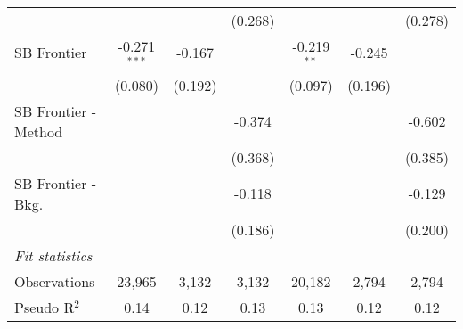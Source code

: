 \begin{tabular}{lcccccc}
                        &                &         & (0.268)       &               &              & (0.278)\\   
   SB Frontier          & -0.271$^{***}$ & -0.167  &               & -0.219$^{**}$ & -0.245       &   \\   
                        & (0.080)        & (0.192) &               & (0.097)       & (0.196)      &   \\   
   SB Frontier - Method &                &         & -0.374        &               &              & -0.602\\   
                        &                &         & (0.368)       &               &              & (0.385)\\   
   SB Frontier - Bkg.   &                &         & -0.118        &               &              & -0.129\\   
                        &                &         & (0.186)       &               &              & (0.200)\\   
   \midrule
   \emph{Fit statistics}\\
   Observations         & 23,965         & 3,132   & 3,132         & 20,182        & 2,794        & 2,794\\  
   Pseudo R$^2$         & 0.14           & 0.12    & 0.13          & 0.13          & 0.12         & 0.12\\  
   

\end{tabular}
